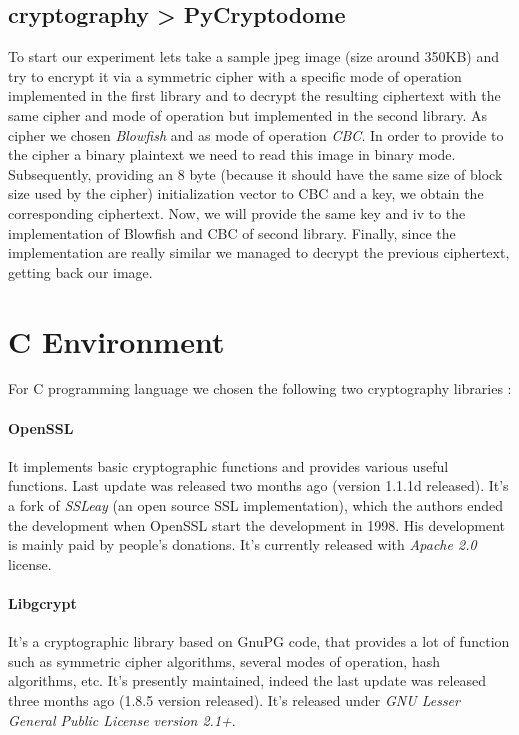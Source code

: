 \documentclass[11pt]{article}
\begin{document}
\subsection{cryptography > PyCryptodome}
To start our experiment lets take a sample jpeg image (size around 350KB) and try to encrypt it via a symmetric cipher with a specific mode of operation implemented in the first library and to decrypt the resulting ciphertext with the same cipher and mode of operation but implemented in the second library. As cipher we chosen \textit{Blowfish} and as mode of operation \textit{CBC}. In order to provide to the cipher a binary plaintext we need to read this image in binary mode. Subsequently, providing an 8 byte (because it should have the same size of block size used by the cipher) initialization vector to CBC and a key, we obtain the corresponding ciphertext. Now, we will provide the same key and iv to the implementation of Blowfish and CBC of second library. Finally, since the implementation are really similar we managed to decrypt the previous ciphertext, getting back our image.
\section{C Environment}
For C programming language we chosen the following two cryptography libraries : 
\paragraph{OpenSSL} It implements basic cryptographic functions and provides various useful functions. Last update was released two months ago (version 1.1.1d released). It's a fork of \textit{SSLeay} (an open source SSL implementation), which the authors ended the development when OpenSSL start the development in 1998. His development is mainly paid by people's donations. It's currently released with \textit{Apache 2.0} license.
\paragraph{Libgcrypt} It's a cryptographic library based on GnuPG code, that provides a lot of function such as symmetric cipher algorithms, several modes of operation, hash algorithms, etc. It's presently maintained, indeed the last update was released three months ago (1.8.5 version released). It's released under \textit{GNU Lesser General Public License version 2.1+}.
\end{document}

